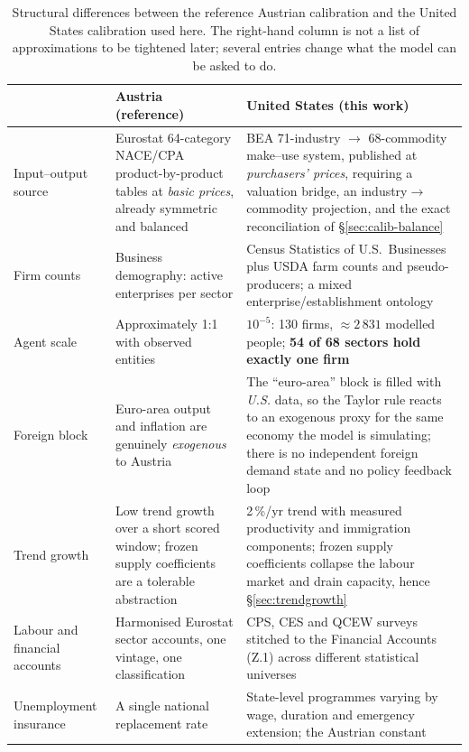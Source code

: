 \documentclass[11pt,a4paper]{article}
\begin{document}
\begin{table}[t]
\centering
\caption{Structural differences between the reference Austrian calibration and the United States
calibration used here. The right-hand column is not a list of approximations to be tightened
later; several entries change what the model can be asked to do.}
\label{tab:austria-us}
\footnotesize
\begin{tabular}{@{}p{}p{}p{}@{}}
\toprule
& \textbf{Austria (reference)} & \textbf{United States (this work)} \\
\midrule
Input--output source
& Eurostat 64-category NACE/CPA product-by-product tables at \emph{basic prices}, already
  symmetric and balanced \citep{eurostat_naio}
& BEA 71-industry $\rightarrow$ 68-commodity make--use system, published at
  \emph{purchasers' prices}, requiring a valuation bridge, an industry$\rightarrow$commodity
  projection, and the exact reconciliation of \S\ref{sec:calib-balance} \citep{bea_io} \\[3pt]
Firm counts
& Business demography: active enterprises per sector
& Census Statistics of U.S.\ Businesses \citep{census_susb} plus USDA farm counts and
  pseudo-producers; a mixed enterprise/establishment ontology \\[3pt]
Agent scale
& Approximately 1:1 with observed entities
& $10^{-5}$: 130 firms, $\approx 2\,831$ modelled people; \textbf{54 of 68 sectors hold exactly one
  firm} \\[3pt]
Foreign block
& Euro-area output and inflation are genuinely \emph{exogenous} to Austria
& The ``euro-area'' block is filled with \emph{U.S.} data, so the Taylor rule reacts to an
  exogenous proxy for the same economy the model is simulating; there is no independent foreign
  demand state and no policy feedback loop \\[3pt]
Trend growth
& Low trend growth over a short scored window; frozen supply coefficients are a tolerable
  abstraction
& 2\,\%/yr trend with measured productivity and immigration components; frozen supply
  coefficients collapse the labour market and drain capacity, hence \S\ref{sec:trendgrowth} \\[3pt]
Labour and financial accounts
& Harmonised Eurostat sector accounts, one vintage, one classification
& CPS, CES and QCEW surveys stitched to the Financial Accounts (Z.1) across
  different statistical universes \citep{bls_data,frb_z1} \\[3pt]
Unemployment insurance
& A single national replacement rate
& State-level programmes varying by wage, duration and emergency extension; the Austrian constant

\end{tabular}
\end{table}
\end{document}
